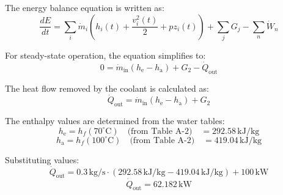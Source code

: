 The energy balance equation is written as:  
\[
\frac{dE}{dt} = \sum_i \dot{m}_i \left( h_i(t) + \frac{v_i^2(t)}{2} + pz_i(t) \right) + \sum_j G_j - \sum_n \dot{W}_n
\]  

For steady-state operation, the equation simplifies to:  
\[
0 = \dot{m}_{\text{in}} (h_{\text{e}} - h_{\text{a}}) + G_2 - \dot{Q}_{\text{out}}
\]  

The heat flow removed by the coolant is calculated as:  
\[
\dot{Q}_{\text{out}} = \dot{m}_{\text{in}} (h_{\text{e}} - h_{\text{a}}) + G_2
\]  

The enthalpy values are determined from the water tables:  
\[
h_{\text{e}} = h_f(70^\circ\text{C}) \quad \text{(from Table A-2)} \quad = 292.58 \, \text{kJ/kg}
\]  
\[
h_{\text{a}} = h_f(100^\circ\text{C}) \quad \text{(from Table A-2)} \quad = 419.04 \, \text{kJ/kg}
\]  

Substituting values:  
\[
\dot{Q}_{\text{out}} = 0.3 \, \text{kg/s} \cdot (292.58 \, \text{kJ/kg} - 419.04 \, \text{kJ/kg}) + 100 \, \text{kW}
\]  
\[
\dot{Q}_{\text{out}} = 62.182 \, \text{kW}
\]